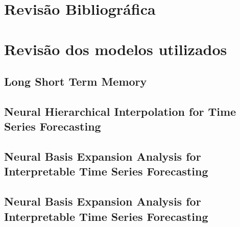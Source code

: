 
\chapter{Revisão Bibliográfica}
\chapter{Revisão dos modelos utilizados}

\section{Long Short Term Memory}
\section{Neural Hierarchical Interpolation for Time Series Forecasting}
\section{Neural Basis Expansion Analysis for Interpretable Time Series Forecasting}
\section{Neural Basis Expansion Analysis for Interpretable Time Series Forecasting}